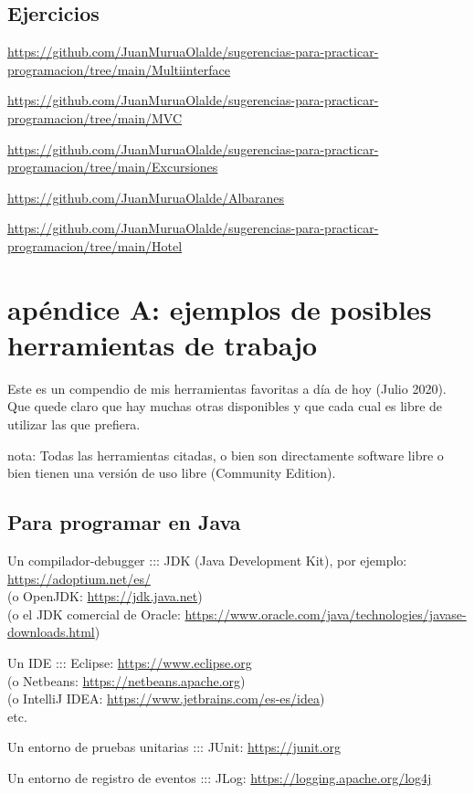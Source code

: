 \documentclass[spanish,12pt,a4paper,final,oneside]{book}
\begin{document}
\section{Ejercicios}

\url{https://github.com/JuanMuruaOlalde/sugerencias-para-practicar-programacion/tree/main/Multiinterface}

\url{https://github.com/JuanMuruaOlalde/sugerencias-para-practicar-programacion/tree/main/MVC}

\url{https://github.com/JuanMuruaOlalde/sugerencias-para-practicar-programacion/tree/main/Excursiones}

\url{https://github.com/JuanMuruaOlalde/Albaranes}

\url{https://github.com/JuanMuruaOlalde/sugerencias-para-practicar-programacion/tree/main/Hotel}




\chapter{apéndice A: ejemplos de posibles herramientas de trabajo}
Este es un compendio de mis herramientas favoritas a día de hoy (Julio 2020). Que quede claro que hay muchas otras disponibles y que cada cual es libre de utilizar las que prefiera.

nota: Todas las herramientas citadas, o bien son directamente software libre o bien tienen una versión de uso libre (Community Edition).

\section{Para programar en Java}
Un compilador-debugger ::: JDK (Java Development Kit), por ejemplo:
\\ \url{https://adoptium.net/es/}
\\ (o OpenJDK: \url{https://jdk.java.net})
\\ (o el JDK comercial de Oracle: \url{https://www.oracle.com/java/technologies/javase-downloads.html})

Un IDE ::: Eclipse: \url{https://www.eclipse.org}
\\(o Netbeans: \url{https://netbeans.apache.org})
\\(o IntelliJ IDEA: \url{https://www.jetbrains.com/es-es/idea})
\\etc.

Un entorno de pruebas unitarias ::: JUnit: \url{https://junit.org}

Un entorno de registro de eventos ::: JLog: \url{https://logging.apache.org/log4j}
\end{document}
